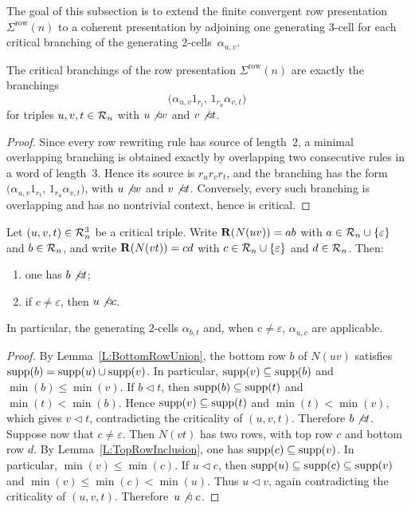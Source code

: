 \documentclass[a4paper, twoside, 11pt, english]{article}
\begin{document}
The goal of this subsection is to extend the finite convergent row presentation
$\Sigma^{\mathrm{row}}(n)$ to a coherent presentation by adjoining one generating
$3$-cell for each critical branching of the generating $2$-cells~$\alpha_{u,v}$.

\begin{lemma}
\label{L:CriticalBranchingsRow}
The critical branchings of the row presentation $\Sigma^{\mathrm{row}}(n)$ are
exactly the branchings
\[
\bigl(\alpha_{u,v}1_{r_t},\,1_{r_u}\alpha_{v,t}\bigr)
\]
for triples $u,v,t\in \mathcal{R}_n$ with $u\not\triangleleft v$ and $v\not\triangleleft t$.
\end{lemma}

\begin{proof}
Since every row rewriting rule has source of length~$2$, a minimal overlapping
branching is obtained exactly by overlapping two consecutive rules in a word of
length~$3$. Hence its source is $r_ur_vr_t$, and the branching has the form~$\bigl(\alpha_{u,v}1_{r_t},\,1_{r_u}\alpha_{v,t}\bigr)$, with $u\not\triangleleft v$ and $v\not\triangleleft t$. Conversely, every such
branching is overlapping and has no nontrivial context, hence is critical.
\end{proof}


\begin{lemma}
\label{L:UsefulReduciblePairsCriticalTriple}
Let $(u,v,t)\in\mathcal{R}_n^3$ be a critical triple. Write $\mathbf{R}(N(uv))=ab$ with
$a\in\mathcal{R}_n\cup\{\varepsilon\}$ and $b\in\mathcal{R}_n$, and write
$\mathbf{R}(N(vt))=cd$ with $c\in\mathcal{R}_n\cup\{\varepsilon\}$ and $d\in\mathcal{R}_n$.
Then:
\begin{enumerate}[\bf i)]
\item one has $b\not\triangleleft t$;
\item if $c\neq\varepsilon$, then $u\not\triangleleft c$.
\end{enumerate}
In particular, the generating $2$-cells $\alpha_{b,t}$ and, when $c\neq\varepsilon$,
$\alpha_{u,c}$ are applicable.
\end{lemma}

\begin{proof}
By Lemma~\ref{L:BottomRowUnion}, the bottom row $b$ of $N(uv)$ satisfies
$\operatorname{supp}(b)=\operatorname{supp}(u)\cup\operatorname{supp}(v)$. In particular,
$\operatorname{supp}(v)\subseteq\operatorname{supp}(b)$ and $\min(b)\le\min(v)$.
If $b\triangleleft t$, then $\operatorname{supp}(b)\subseteq\operatorname{supp}(t)$ and
$\min(t)<\min(b)$. Hence $\operatorname{supp}(v)\subseteq\operatorname{supp}(t)$ and
$\min(t)<\min(v)$, which gives $v\triangleleft t$, contradicting the
criticality of $(u,v,t)$. Therefore $b\not\triangleleft t$.
Suppose now that $c\neq\varepsilon$. Then $N(vt)$ has two rows, with top row
$c$ and bottom row $d$. By Lemma~\ref{L:TopRowInclusion}, one has
$\operatorname{supp}(c)\subseteq\operatorname{supp}(v)$. In particular, $\min(v)\le\min(c)$.
If $u\triangleleft c$, then $\operatorname{supp}(u)\subseteq\operatorname{supp}(c)\subseteq\operatorname{supp}(v)$ and
$\min(v)\le\min(c)<\min(u)$. Thus $u\triangleleft v$, again contradicting the
criticality of $(u,v,t)$. Therefore~$u\not\triangleleft~c$.
\end{proof}
\end{document}
